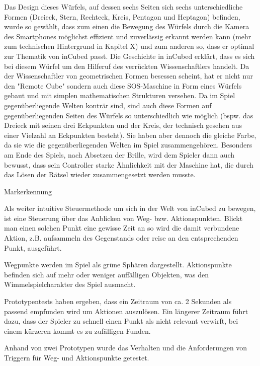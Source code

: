Das Design dieses Würfels, auf dessen sechs Seiten sich sechs unterschiedliche Formen (Dreieck, Stern, Rechteck, Kreis, Pentagon und Heptagon) befinden, wurde so gewählt, dass zum einen die Bewegung des Würfels durch die Kamera des Smartphones möglichst effizient und zuverlässig erkannt werden kann (mehr zum technischen Hintergrund in Kapitel X) und zum anderen so, dass er optimal zur Thematik von inCubed passt. Die Geschichte in inCubed erklärt, dass es sich bei diesem Würfel um den Hilferuf des verrückten Wissenschaftlers handelt. Da der Wissenschaftler von geometrischen Formen besessen scheint, hat er nicht nur den "Remote Cube" sondern auch diese SOS-Maschine in Form eines Würfels gebaut und mit simplen mathematischen Strukturen versehen. Da im Spiel gegenüberliegende Welten konträr sind, sind auch diese Formen auf gegenüberliegenden Seiten des Würfels so unterschiedlich wie möglich (bspw. das Dreieck mit seinen drei Eckpunkten und der Kreis, der technisch gesehen aus einer Vielzahl an Eckpunkten besteht). Sie haben aber dennoch die gleiche Farbe, da sie wie die gegenüberliegenden Welten im Spiel zusammengehören. Besonders am Ende des Spiels, nach Absetzen der Brille, wird dem Spieler dann auch bewusst, dass sein Controller starke Ähnlichkeit mit der Maschine hat, die durch das Lösen der Rätsel wieder zusammengesetzt werden musste.

Markerkennung


Als weiter intuitive Steuermethode um sich in der Welt von inCubed zu bewegen, ist eine Steuerung über das Anblicken von Weg- bzw. Aktionspunkten. Blickt man einen solchen Punkt eine gewisse Zeit an so wird die damit verbundene Aktion, z.B. aufsammeln des Gegenstands oder reise an den entsprechenden Punkt, ausgeführt.

Wegpunkte werden im Spiel als grüne Sphären dargestellt. Aktionspunkte befinden sich auf mehr oder weniger auffälligen Objekten, was den Wimmelspielcharakter des Spiel ausmacht.

Prototypentests haben ergeben, dass ein Zeitraum von ca. 2 Sekunden als passend empfunden wird um Aktionen auszulösen. Ein längerer Zeitraum führt dazu, dass der Spieler zu schnell einen Punkt als nicht relevant verwirft, bei einem kürzeren kommt es zu zufälligen Funden.


Anhand von zwei Prototypen wurde das Verhalten und die Anforderungen von Triggern für Weg- und Aktionspunkte getestet.

